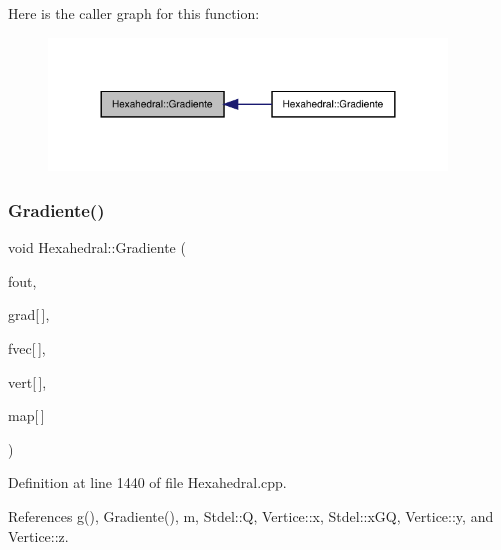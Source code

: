 Here is the caller graph for this function\+:
\nopagebreak
\begin{figure}[H]
\begin{center}
\leavevmode
\includegraphics[width=300pt]{classHexahedral_a95829c691aa24fd293bdeeb60826f729_icgraph}
\end{center}
\end{figure}
\mbox{\label{classHexahedral_a244f208541f6a22826ff5265445ff4d7}} 
\subsubsection{\texorpdfstring{Gradiente()}{Gradiente()}\hspace{0.1cm}{\footnotesize\ttfamily [2/6]}}
{\footnotesize\ttfamily void Hexahedral\+::\+Gradiente (\begin{DoxyParamCaption}\item[{F\+I\+LE $\ast$}]{fout,  }\item[{double $\ast$}]{grad\mbox{[}$\,$\mbox{]},  }\item[{const double}]{fvec\mbox{[}$\,$\mbox{]},  }\item[{const \hyperlink{structVertice}{Vertice}}]{vert\mbox{[}$\,$\mbox{]},  }\item[{const int}]{map\mbox{[}$\,$\mbox{]} }\end{DoxyParamCaption})\hspace{0.3cm}{\ttfamily [virtual]}}



Definition at line 1440 of file Hexahedral.\+cpp.



References g(), Gradiente(), m, Stdel\+::Q, Vertice\+::x, Stdel\+::x\+GQ, Vertice\+::y, and Vertice\+::z.

